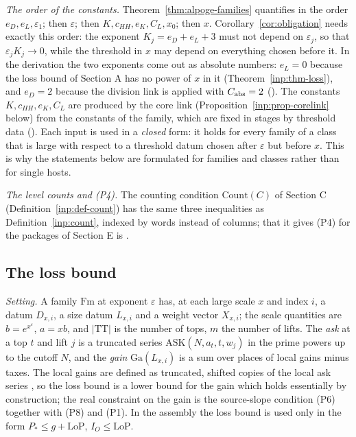 \documentclass[10pt]{amsart}
\theoremstyle{definition}
\theoremstyle{remark}
\begin{document}
\emph{The order of the constants.} Theorem~\ref{thm:alpoge-families}
quantifies in the order $e_D,e_L,\varepsilon_1$; then $\varepsilon$; then
$K,c_{HH},e_K,C_L,x_0$; then $x$. Corollary~\ref{cor:obligation} needs
exactly this order: the exponent $K_j=e_D+e_L+3$ must not depend on
$\varepsilon_j$, so that $\varepsilon_jK_j\to0$, while the threshold in $x$
may depend on everything chosen before it. In the derivation the two
exponents come out as absolute numbers: $e_L=0$ because the loss bound of
Section A has no power of $x$ in it (Theorem~\ref{inp:thm-loss}), and
$e_D=2$ because the division link is applied with $C_{\rm abs}=2$
(\cite[Proposition~\ref{A-i4:prop-links-formal}(a)]{Annex}). The
constants $K,c_{HH},e_K,C_L$ are produced by the core link
(Proposition~\ref{inp:prop-corelink} below) from the constants of the
family, which are fixed in stages by threshold data
(\cite[\S\ref{A-i4:ssec-closed}]{Annex}). Each input is used in a
\emph{closed} form: it holds for every family of a class that is large
with respect to a threshold datum chosen after $\varepsilon$ but before
$x$. This is why the statements below are formulated for families and
classes rather than for single hosts.

\emph{The level counts and (P4).} The counting condition $\mathrm{Count}(C)$
of Section C (Definition~\ref{inp:def-count}) has the same three
inequalities as Definition~\ref{inp:count}, indexed by words instead of
columns; that it gives (P4) for the packages of Section E is
\cite[Proposition~\ref{A-i4:hyp-S}(c)]{Annex}.

\subsection{The loss bound}\label{inp:ssec-loss}

\emph{Setting.} A family $\mathrm{Fm}$ at exponent $\varepsilon$ has, at
each large scale $x$ and index $i$, a datum $D_{x,i}$, a size datum
$L_{x,i}$ and a weight vector $X_{x,i}$; the scale quantities are
$b=e^{x^\varepsilon}$, $a=xb$, and $|\mathrm{TT}|$ is the number of tops,
$m$ the number of lifts. The \emph{ask} at a top $t$ and lift $j$ is a
truncated series $\mathrm{ASK}(N,a_t,t,w_j)$ in the prime powers up to the
cutoff $N$, and the \emph{gain} $\mathrm{Ga}(L_{x,i})$ is a sum over places
of local gains minus taxes. The local gains are defined as truncated,
shifted copies of the local ask series
\cite[Remark~\ref{A-i1:rem-gain}]{Annex}, so the loss bound is a lower bound
for the gain which holds essentially by construction; the real constraint
on the gain is the source-slope condition (P6) together with (P8) and
(P1). In the assembly the loss bound is used only in the form
$P_*\le g+\mathrm{LoP}$, $I_O\le\mathrm{LoP}$.
\end{document}
